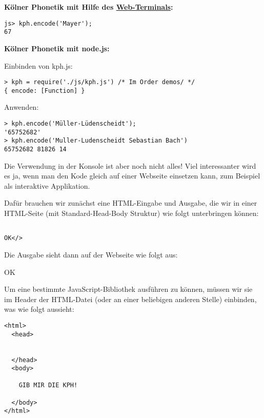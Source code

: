 \par\noindent\textbf{Kölner Phonetik mit Hilfe des
\href{../demos/console.html}{Web-Terminals}:}

\begin{verbatim}
js> kph.encode('Mayer');
67
\end{verbatim}

{ }



\par\noindent\textbf{Kölner Phonetik mit node.js:}

{Einbinden von kph.js:}

\begin{verbatim}
> kph = require('./js/kph.js') /* Im Order demos/ */
{ encode: [Function] }
\end{verbatim}

{Anwenden:}

\begin{verbatim}
> kph.encode('Müller-Lüdenscheidt');
'65752682'
> kph.encode('Muller-Ludenscheidt Sebastian Bach')
65752682 81826 14
\end{verbatim}



Die Verwendung in der Konsole ist aber noch nicht alles! Viel
interessanter wird es ja, wenn man den Kode gleich auf einer Webseite
einsetzen kann, zum Beispiel als interaktive Applikation.

Dafür brauchen wir zunächst eine HTML-Eingabe und Ausgabe, die wir in
einer HTML-Seite (mit Standard-Head-Body Struktur) wie folgt
unterbringen können:

\begin{verbatim}

OK</>
\end{verbatim}

{Die Ausgabe sieht dann auf der Webseite wie folgt aus:}

OK




Um eine bestimmte JavaScript-Bibliothek ausführen zu können, müssen wir
sie im Header der HTML-Datei (oder an einer beliebigen anderen Stelle)
einbinden, was wie folgt aussieht:

\begin{verbatim}
<html>
  <head>
    
    
  </head>
  <body>
    
    GIB MIR DIE KPH!
    
  </body>
</html>
\end{verbatim}



